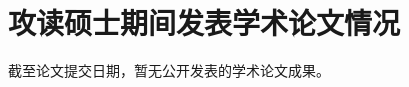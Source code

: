 \documentclass[12pt,UTF8,twoside]{ctexart}
\theoremstyle{mystyle}
\begin{document}








\newpage
{}






\newpage
{}
\section*{攻读硕士期间发表学术论文情况}

\noindent[1] 截至论文提交日期，暂无公开发表的学术论文成果。


%
\end{document}
